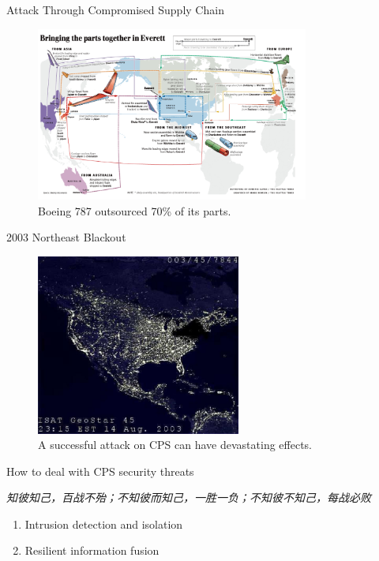 \documentclass[10pt]{beamer}
\begin{document}
\begin{frame}{Attack Through Compromised Supply Chain}
  \begin{figure}[ht]
    \centering
    \includegraphics[width=0.8\textwidth]{boeing.jpg}
    \caption{Boeing 787 outsourced 70\% of its parts.}
  \end{figure}
\end{frame}

\begin{frame}{2003 Northeast Blackout}
  \begin{figure}[<+htpb+>]
    \begin{center}
      \includegraphics[width=0.60\textwidth]{blackout.jpg}
      \caption{A successful attack on CPS can have devastating effects.}
    \end{center}
  \end{figure}
\end{frame}

\begin{frame}{How to deal with CPS security threats}
  \begin{exampleblock}{}
    {\it 知彼知己，百战不殆；不知彼而知己，一胜一负；不知彼不知己，每战必败}
    \vskip5mm
    \hspace*{}
  \end{exampleblock}

  \begin{enumerate}
  \item Intrusion detection and isolation
  \item Resilient information fusion
  \end{enumerate}
\end{frame}
\end{document}
